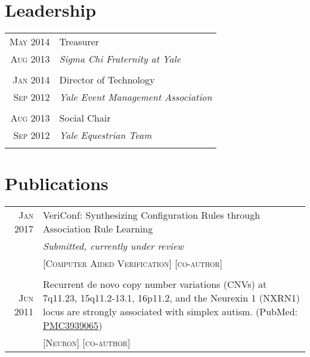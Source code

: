 \documentclass[a4paper,10pt]{article}
\begin{document}
\section{Leadership}
\begin{longtable}{r|p{11cm}}
 \nopagebreak \textsc{May 2014} & Treasurer \\
 \nopagebreak \textsc{Aug 2013} & \small\emph{Sigma Chi Fraternity at Yale} \\
 \multicolumn{2}{c}{} \\
 \nopagebreak \textsc{Jan 2014} & Director of Technology \\
 \nopagebreak \textsc{Sep 2012} & \small\emph{Yale Event Management Association} \\
 \multicolumn{2}{c}{} \\
 \nopagebreak \textsc{Aug 2013} & Social Chair \\
 \nopagebreak \textsc{Sep 2012} & \small\emph{Yale Equestrian Team} \\
 \multicolumn{2}{c}{} \\
\end{longtable}

\section{Publications}
\begin{tabular}{rp{11cm}}
 \textsc{Jan} 2017 & VeriConf: Synthesizing Configuration Rules through Association Rule Learning\\
 								& \small\emph{Submitted, currently under review} \\
 							    & \textsc{[Computer Aided Verification]} \textsc{[co-author]} \\
\multicolumn{2}{c}{} \\
 \textsc{Jun} 2011 & Recurrent de novo copy number variations (CNVs) at 7q11.23, 15q11.2-13.1, 16p11.2, and the Neurexin 1 (NXRN1) locus are strongly associated with simplex autism. (PubMed: \href{https://www.ncbi.nlm.nih.gov/pmc/articles/PMC3939065/}{PMC3939065}) \\
 							   & \textsc{[Neuron]} \textsc{[co-author]} 
\end{tabular}

\end{document}
